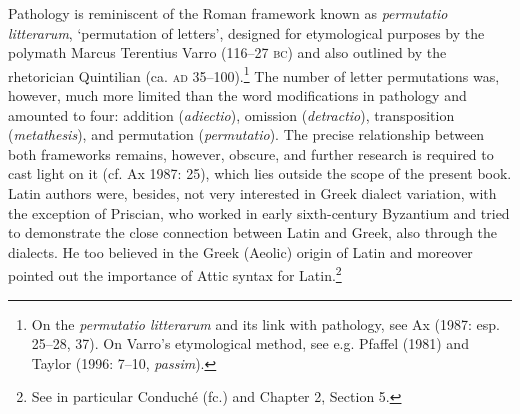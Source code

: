 \begin{styleCatalogusnotities}
Pathology is reminiscent of the Roman framework known as \textit{permutatio litterarum}, ‘permutation of letters’, designed for etymological purposes by the polymath Marcus Terentius Varro (116–27 \textsc{bc}) and also outlined by the rhetorician Quintilian (ca. \textsc{ad} 35–100).\footnote{\textrm{ On the }\textrm{\textit{permutatio litterarum }}\textrm{and its link with pathology, see Ax (1987: esp. 25–28, 37). On Varro’s etymological method, see e.g. Pfaffel (1981) and Taylor (1996: 7–10, }\textrm{\textit{passim}}\textrm{).}} The number of letter permutations was, however, much more limited than the word modifications in pathology and amounted to four: addition (\textit{adiectio}), omission (\textit{detractio}), transposition (\textit{metathesis}), and permutation (\textit{permutatio}). The precise relationship between both frameworks remains, however, obscure, and further research is required to cast light on it (cf. Ax 1987: 25), which lies outside the scope of the present book. Latin authors were, besides, not very interested in Greek dialect variation, with the exception of Priscian, who worked in early sixth-century Byzantium and tried to demonstrate the close connection between Latin and Greek, also through the dialects. He too believed in the Greek (Aeolic) origin of Latin and moreover pointed out the importance of Attic syntax for Latin.\footnote{\textrm{ See in particular Conduché (fc.) and Chapter 2, Section 5.}}
\end{styleCatalogusnotities}

